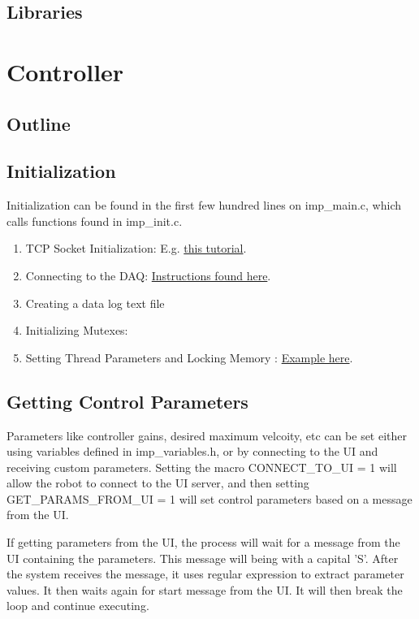 \documentclass{article}
\begin{document}
	\subsection{Libraries}

\section{Controller}
	\subsection{Outline}
	
	
	\subsection{Initialization}
	Initialization can be found in the first few hundred lines on imp\_main.c, which calls functions found in imp\_init.c. 
	
	\begin{enumerate}
		\item TCP Socket Initialization: E.g. \href{https://www.geeksforgeeks.org/tcp-server-client-implementation-in-c/}{this tutorial}.
		\item Connecting to the DAQ: \href{https://labjack.com/support/software/api/ljm/function-reference/ljmopen}{Instructions found here}.
		\item Creating a data log text file 
		\item Initializing Mutexes: 
		\item Setting Thread Parameters and Locking Memory : \href{https://wiki.linuxfoundation.org/realtime/documentation/howto/applications/application_base}{Example here}.
	\end{enumerate}
	
	\subsection{Getting Control Parameters}
	Parameters like controller gains, desired maximum velcoity, etc can be set either using variables defined in imp\_variables.h, or by connecting to the UI and receiving custom parameters. Setting the macro CONNECT\_TO\_UI = 1 will allow the robot to connect to the UI server, and then setting GET\_PARAMS\_FROM\_UI = 1 will set control parameters based on a message from the UI.

	If getting parameters from the UI, the process will wait for a message from the UI containing the parameters. This message will being with a capital 'S'. After the system receives the message, it uses regular expression to extract parameter values. It then waits again for start message from the UI. It will then break the loop and continue executing.
\end{document}
